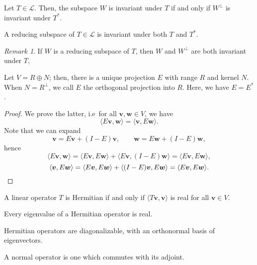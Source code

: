 \documentclass[11pt]{article}
\renewcommand{\vec}[1]{\boldsymbol{#1}}
\newcommand{\vv}{\vec{v}}
\newcommand{\vw}{\vec{w}}
\newcommand{\alg}[1]{\mathscr{#1}}
\newcommand{\ip}[2]{\langle #1, #2 \rangle}
\theoremstyle{definition}
\theoremstyle{remark}
\newtheorem*{remark}{Remark}
\numberwithin{equation}{section}
\begin{document}
    \begin{lemma}
        Let $T \in \alg{L}$. Then, the subspace $W$ is invariant under $T$ if and
        only if $W^\perp$ is invariant under $T^*$.
    \end{lemma}

    \begin{definition}
        A reducing subspace of $T \in \alg{L}$ is invariant under both $T$ and $T^*$.
        \begin{remark}
            If $W$ is a reducing subspace of $T$, then $W$ and $W^\perp$ are both
            invariant under $T$,
        \end{remark}
    \end{definition}

    \begin{lemma}
        Let $V = R \oplus N$; then, there is a unique projection $E$ with range $R$
        and kernel $N$. When $N = R^\perp$, we call $E$ the orthogonal projection into
        $R$. Here, we have $E = E^*$.
    \end{lemma}
    \begin{proof}
        We prove the latter, i.e\ for all $\vv, \vw \in V$, we have \[
            \ip{E\vv}{\vw} = \ip{\vv}{E\vw}.
        \] Note that we can expand \[
            \vv = E\vv + (I - E)\vv, \qquad
            \vw = E\vw + (I - E)\vw,
        \] hence \[
            \ip{E\vv}{\vw} = \ip{E\vv}{E\vw} + \ip{E\vv}{(I - E)\vw} =
            \ip{E\vv}{E\vw},
        \] \[
            \ip{\vv}{E\vw} = \ip{E\vv}{E\vw} + \ip{(I - E)\vv}{E\vw} =
            \ip{E\vv}{E\vw}. \qedhere
        \] 
    \end{proof}
    
    \begin{lemma}
        A linear operator $T$ is Hermitian if and only if $\ip{T\vv}{\vv}$ is real
        for all $\vv \in V$.
    \end{lemma}
    \begin{corollary}
        Every eigenvalue of a Hermitian operator is real.
    \end{corollary}

    \begin{theorem}
        Hermitian operators are diagonalizable, with an orthonormal basis of
        eigenvectors.
    \end{theorem}

    \begin{definition}
        A normal operator is one which commutes with its adjoint.
    \end{definition}
\end{document}
